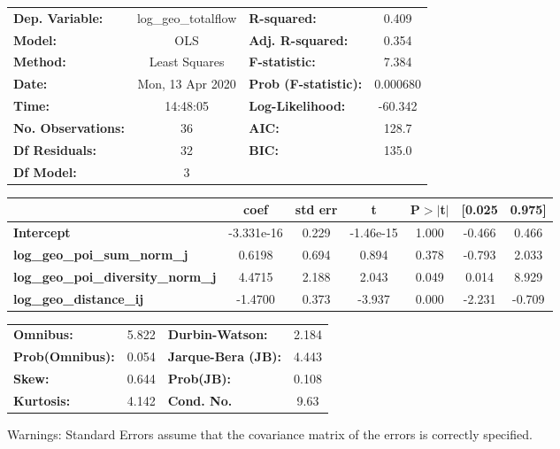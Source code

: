 \begin{center}
\begin{tabular}{lclc}
\toprule
\textbf{Dep. Variable:}                    & log\_geo\_totalflow & \textbf{  R-squared:         } &     0.409   \\
\textbf{Model:}                            &         OLS         & \textbf{  Adj. R-squared:    } &     0.354   \\
\textbf{Method:}                           &    Least Squares    & \textbf{  F-statistic:       } &     7.384   \\
\textbf{Date:}                             &   Mon, 13 Apr 2020  & \textbf{  Prob (F-statistic):} &  0.000680   \\
\textbf{Time:}                             &       14:48:05      & \textbf{  Log-Likelihood:    } &   -60.342   \\
\textbf{No. Observations:}                 &            36       & \textbf{  AIC:               } &     128.7   \\
\textbf{Df Residuals:}                     &            32       & \textbf{  BIC:               } &     135.0   \\
\textbf{Df Model:}                         &             3       & \textbf{                     } &             \\
\bottomrule
\end{tabular}
\begin{tabular}{lcccccc}
                                           & \textbf{coef} & \textbf{std err} & \textbf{t} & \textbf{P$> |$t$|$} & \textbf{[0.025} & \textbf{0.975]}  \\
\midrule
\textbf{Intercept}                         &   -3.331e-16  &        0.229     & -1.46e-15  &         1.000        &       -0.466    &        0.466     \\
\textbf{log\_geo\_poi\_sum\_norm\_j}       &       0.6198  &        0.694     &     0.894  &         0.378        &       -0.793    &        2.033     \\
\textbf{log\_geo\_poi\_diversity\_norm\_j} &       4.4715  &        2.188     &     2.043  &         0.049        &        0.014    &        8.929     \\
\textbf{log\_geo\_distance\_ij}            &      -1.4700  &        0.373     &    -3.937  &         0.000        &       -2.231    &       -0.709     \\
\bottomrule
\end{tabular}
\begin{tabular}{lclc}
\textbf{Omnibus:}       &  5.822 & \textbf{  Durbin-Watson:     } &    2.184  \\
\textbf{Prob(Omnibus):} &  0.054 & \textbf{  Jarque-Bera (JB):  } &    4.443  \\
\textbf{Skew:}          &  0.644 & \textbf{  Prob(JB):          } &    0.108  \\
\textbf{Kurtosis:}      &  4.142 & \textbf{  Cond. No.          } &     9.63  \\
\bottomrule
\end{tabular}
\end{center}

Warnings: \newline
 [1] Standard Errors assume that the covariance matrix of the errors is correctly specified.